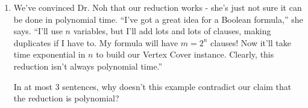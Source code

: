 \documentclass[12 pt, letterpaper]{hmcpset}
\begin{document}
\begin{problem}
\begin{enumerate}
    Dr. Noh is right that if we could find a solution to our constructed instance of {\sc Vertex Cover} when there was no satisfying assignment in the original {\sc 3SAT} instance, that would invalidate the reduction. In 1-2 sentences, why doesn't this proposed cover break the reduction?
    
    \item We've convinced Dr. Noh that our reduction works - she's just not sure it can be done in polynomial time. ``I've got a great idea for a Boolean formula,'' she says. ``I'll use $n$ variables, but I'll add lots and lots of clauses, making duplicates if I have to. My formula will have $m = 2^n$ clauses! Now it'll take time exponential in $n$ to build our Vertex Cover instance. Clearly, this reduction isn't always polynomial time.''

    In at most 3 sentences, why doesn't this example contradict our claim that the reduction is polynomial?
\end{enumerate}
\end{problem}
\end{document}
